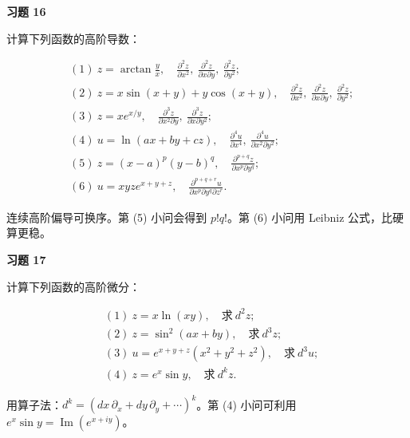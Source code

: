\begin{exercisebox}
\textbf{习题 16}

计算下列函数的高阶导数：

\[
      \begin{aligned}
      &(1)\ z=\arctan\frac{y}{x},\quad
      \frac{\partial^2z}{\partial x^2},\
      \frac{\partial^2z}{\partial x\partial y},\
      \frac{\partial^2z}{\partial y^2};\\
      &(2)\ z=x\sin(x+y)+y\cos(x+y),\quad
      \frac{\partial^2z}{\partial x^2},\
      \frac{\partial^2z}{\partial x\partial y},\
      \frac{\partial^2z}{\partial y^2};\\
      &(3)\ z=xe^{x/y},\quad
      \frac{\partial^3z}{\partial x^2\partial y},\
      \frac{\partial^3z}{\partial x\partial y^2};\\
      &(4)\ u=\ln(ax+by+cz),\quad
      \frac{\partial^4u}{\partial x^4},\
      \frac{\partial^4u}{\partial x^2\partial y^2};\\
      &(5)\ z=(x-a)^p(y-b)^q,\quad
      \frac{\partial^{p+q}z}{\partial x^p\partial y^q};\\
      &(6)\ u=xyze^{x+y+z},\quad
      \frac{\partial^{p+q+r}u}{\partial x^p\partial y^q\partial z^r}.
      \end{aligned}
      \]

\begin{hintbox}
连续高阶偏导可换序。第 (5) 小问会得到 \(p!q!\)。第 (6) 小问用 Leibniz 公式，比硬算更稳。
\end{hintbox}
\end{exercisebox}

\begin{exercisebox}
\textbf{习题 17}

计算下列函数的高阶微分：

\[
      \begin{aligned}
      &(1)\ z=x\ln(xy),\quad \text{求}\ d^2z;\\
      &(2)\ z=\sin^2(ax+by),\quad \text{求}\ d^3z;\\
      &(3)\ u=e^{x+y+z}(x^2+y^2+z^2),\quad \text{求}\ d^3u;\\
      &(4)\ z=e^x\sin y,\quad \text{求}\ d^kz.
      \end{aligned}
      \]

\begin{hintbox}
用算子法：\(d^k=(dx\,\partial_x+dy\,\partial_y+\cdots)^k\)。第 (4) 小问可利用 \(e^x\sin y=\operatorname{Im}(e^{x+iy})\)。
\end{hintbox}
\end{exercisebox}

